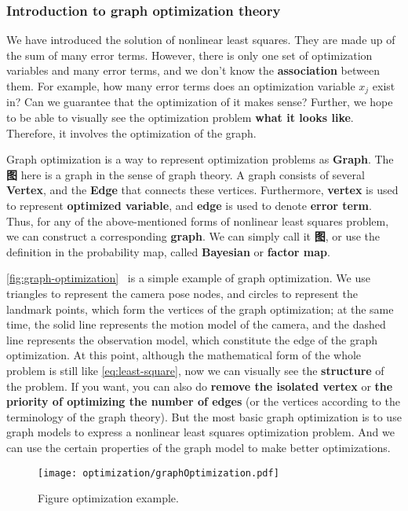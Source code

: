 \subsubsection{Introduction to graph optimization theory}
We have introduced the solution of nonlinear least squares. They are made up of the sum of many error terms. However, there is only one set of optimization variables and many error terms, and we don't know the \textbf{association} between them. For example, how many error terms does an optimization variable $x_j$ exist in? Can we guarantee that the optimization of it makes sense? Further, we hope to be able to visually see the optimization problem \textbf{what it looks like}. Therefore, it involves the optimization of the graph.

Graph optimization is a way to represent optimization problems as \textbf{Graph}. The \textbf{图} here is a graph in the sense of graph theory. A graph consists of several \textbf{Vertex}, and the \textbf{Edge} that connects these vertices. Furthermore, \textbf{vertex} is used to represent \textbf{optimized variable}, and \textbf{edge} is used to denote \textbf{error term}. Thus, for any of the above-mentioned forms of nonlinear least squares problem, we can construct a corresponding \textbf{graph}. We can simply call it \textbf{图}, or use the definition in the probability map, called \textbf{Bayesian} or \textbf{factor map}.

\autoref{fig:graph-optimization}~ is a simple example of graph optimization. We use triangles to represent the camera pose nodes, and circles to represent the landmark points, which form the vertices of the graph optimization; at the same time, the solid line represents the motion model of the camera, and the dashed line represents the observation model, which constitute the edge of the graph optimization. At this point, although the mathematical form of the whole problem is still like \eqref{eq:least-square}, now we can visually see the \textbf{structure} of the problem. If you want, you can also do \textbf{remove the isolated vertex} or \textbf{the priority of optimizing the number of edges} (or the vertices according to the terminology of the graph theory). But the most basic graph optimization is to use graph models to express a nonlinear least squares optimization problem. And we can use the certain properties of the graph model to make better optimizations.
\begin{figure}[!ht]
    \centering
    \texttt{[image: optimization/graphOptimization.pdf]}
    \caption{Figure optimization example. }
    \label{fig:graph-optimization}
    \end{figure}
    
